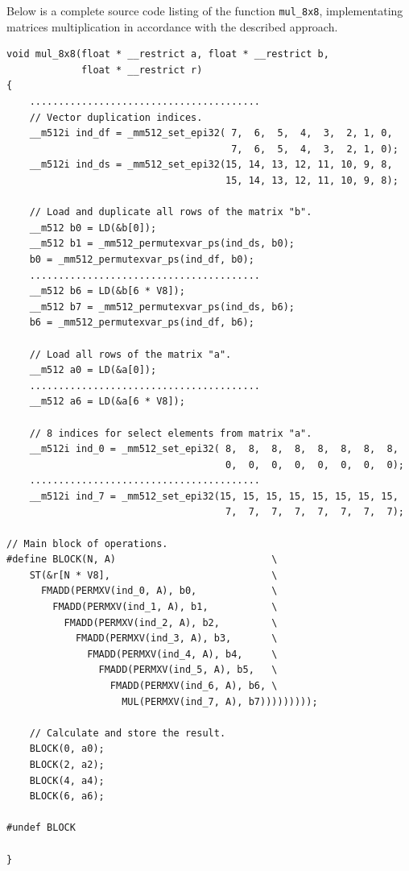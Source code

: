 \documentclass[
11pt,%
tightenlines,%
twoside,%
onecolumn,%
nofloats,%
nobibnotes,%
nofootinbib,%
superscriptaddress,%
noshowpacs,%
centertags]%
{revtex4}
\begin{document}
Below is a complete source code listing of the function \texttt{mul\_8x8}, implementating matrices multiplication in accordance with the described approach.

\begin{lstlisting}
void mul_8x8(float * __restrict a, float * __restrict b,
             float * __restrict r)
{
    ........................................
    // Vector duplication indices.
    __m512i ind_df = _mm512_set_epi32( 7,  6,  5,  4,  3,  2, 1, 0,
                                       7,  6,  5,  4,  3,  2, 1, 0);
    __m512i ind_ds = _mm512_set_epi32(15, 14, 13, 12, 11, 10, 9, 8,
                                      15, 14, 13, 12, 11, 10, 9, 8);

    // Load and duplicate all rows of the matrix "b".
    __m512 b0 = LD(&b[0]);
    __m512 b1 = _mm512_permutexvar_ps(ind_ds, b0);
    b0 = _mm512_permutexvar_ps(ind_df, b0);
    ........................................
    __m512 b6 = LD(&b[6 * V8]);
    __m512 b7 = _mm512_permutexvar_ps(ind_ds, b6);
    b6 = _mm512_permutexvar_ps(ind_df, b6);

    // Load all rows of the matrix "a".
    __m512 a0 = LD(&a[0]);
    ........................................
    __m512 a6 = LD(&a[6 * V8]);

    // 8 indices for select elements from matrix "a".
    __m512i ind_0 = _mm512_set_epi32( 8,  8,  8,  8,  8,  8,  8,  8,
                                      0,  0,  0,  0,  0,  0,  0,  0);
    ........................................
    __m512i ind_7 = _mm512_set_epi32(15, 15, 15, 15, 15, 15, 15, 15,
                                      7,  7,  7,  7,  7,  7,  7,  7);

// Main block of operations.
#define BLOCK(N, A)                           \
    ST(&r[N * V8],                            \
      FMADD(PERMXV(ind_0, A), b0,             \
        FMADD(PERMXV(ind_1, A), b1,           \
          FMADD(PERMXV(ind_2, A), b2,         \
            FMADD(PERMXV(ind_3, A), b3,       \
              FMADD(PERMXV(ind_4, A), b4,     \
                FMADD(PERMXV(ind_5, A), b5,   \
                  FMADD(PERMXV(ind_6, A), b6, \
                    MUL(PERMXV(ind_7, A), b7)))))))));

    // Calculate and store the result.
    BLOCK(0, a0);
    BLOCK(2, a2);
    BLOCK(4, a4);
    BLOCK(6, a6);

#undef BLOCK

}
\end{lstlisting}
\end{document}
